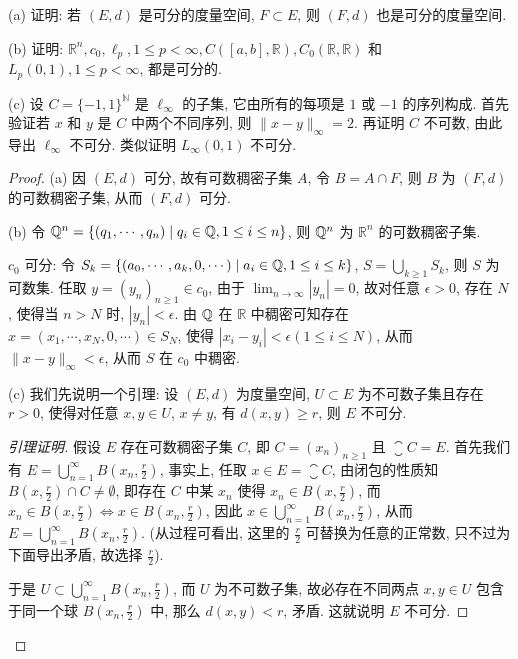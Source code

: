 \begin{exercise}
    (a) 证明: 若 $(E,d)$ 是可分的度量空间, $F\subset E$,
    则 $(F,d)$ 也是可分的度量空间.

    (b) 证明: $\mathbb{R}^{n}, c_{0}, \ell_{p}, 1 \leq p<\infty, C([a, b], \mathbb{R}), C_{0}(\mathbb{R}, \mathbb{R})$ 
    和 $L_{p}(0,1), 1 \leq p<\infty$, 都是可分的.

    (c) 设 $C=\{-1,1\}^{\mathbb{N}}$ 是 $\ell_{\infty}$ 的子集, 
    它由所有的每项是 $1$ 或 $-1$ 的序列构成. 首先验证若 $x$ 和 $y$ 是 $C$ 中两个不同序列, 
    则 $\|x-y\|_{\infty}=2$. 再证明 $C$ 不可数, 由此导出 $\ell_{\infty}$ 不可分.
    类似证明 $L_{\infty}(0,1)$ 不可分.
\end{exercise}

\begin{proof}
    (a) 因 $(E,d)$ 可分, 故有可数稠密子集 $A$, 令 $B=A\cap F$,
    则 $B$ 为 $(F,d)$ 的可数稠密子集, 从而 $(F,d)$ 可分.

    (b) 令 $\mathbb{Q}^n=\{(q_1,\cdots,q_n)\mid q_i\in\mathbb{Q}, 1\leq i\leq n\}$, 
    则 $\mathbb{Q}^n$ 为 $\mathbb{R}^n$ 的可数稠密子集.

    $c_0$ 可分: 令 $S_k=\{(a_0,\cdots,a_k,0,\cdots)\mid a_i\in\mathbb{Q},1\leq i\leq k\}$,
    $S=\bigcup_{k\geq 1}S_k$, 则 $S$ 为可数集.
    任取 $y=(y_n)_{n\geq 1}\in c_0$, 由于 $\lim_{n\to\infty}|y_n|=0$,
    故对任意 $\epsilon>0$, 存在 $N$, 使得当 $n>N$ 时, $|y_n|<\epsilon$.
    由 $\mathbb{Q}$ 在 $\mathbb{R}$ 中稠密可知存在 $x=(x_1,\cdots,x_N,0,\cdots)\in S_N$,
    使得 $|x_i-y_i|<\epsilon(1\leq i\leq N)$, 从而 $\|x-y\|_{\infty}<\epsilon$,
    从而 $S$ 在 $c_0$ 中稠密.

    (c) 我们先说明一个引理:
    设 $(E,d)$ 为度量空间, $U\subset E$ 为不可数子集且存在 $r>0$,
    使得对任意 $x,y\in U$, $x\neq y$, 有 $d(x,y)\geq r$,
    则 $E$ 不可分.
    \begin{proof}[引理证明]
        假设 $E$ 存在可数稠密子集 $C$, 即 $C=(x_n)_{n\geq 1}$ 且 $\closure{C}=E$.
        首先我们有 $E=\bigcup_{n=1}^{\infty}B(x_n,\frac{r}{2})$,
        事实上, 任取 $x\in E=\closure{C}$, 由闭包的性质知 $B(x,\frac{r}{2})\cap C\neq\emptyset$,
        即存在 $C$ 中某 $x_n$ 使得 $x_n\in B(x,\frac{r}{2})$,
        而 $x_n\in B(x,\frac{r}{2})\Leftrightarrow x\in B(x_n,\frac{r}{2})$, 因此
        $x\in\bigcup_{n=1}^{\infty}B(x_n,\frac{r}{2})$, 从而 $E=\bigcup_{n=1}^{\infty}B(x_n,\frac{r}{2})$. 
        (从过程可看出, 这里的 $\frac{r}{2}$ 可替换为任意的正常数, 只不过为下面导出矛盾,
        故选择 $\frac{r}{2}$).

        于是 $U\subset\bigcup_{n=1}^{\infty}B(x_n,\frac{r}{2})$,
        而 $U$ 为不可数子集, 故必存在不同两点 $x,y\in U$ 包含于同一个球 $B(x_n,\frac{r}{2})$ 中,
        那么 $d(x,y)<r$, 矛盾. 这就说明 $E$ 不可分.
    \end{proof}
    

\end{proof}
